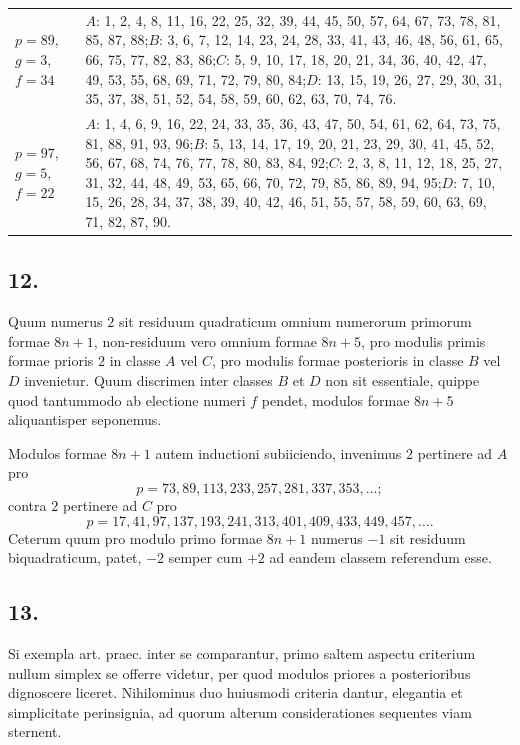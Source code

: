 \documentclass[12pt]{article}
\begin{document}
\begin{longtable}{>{\raggedright\arraybackslash}p{}p{}}
$p=89$, $g=3$, $f=34$ &
$A$: 1, 2, 4, 8, 11, 16, 22, 25, 32, 39, 44, 45, 50, 57, 64, 67, 73, 78, 81, 85, 87, 88;\quad $B$: 3, 6, 7, 12, 14, 23, 24, 28, 33, 41, 43, 46, 48, 56, 61, 65, 66, 75, 77, 82, 83, 86;\quad $C$: 5, 9, 10, 17, 18, 20, 21, 34, 36, 40, 42, 47, 49, 53, 55, 68, 69, 71, 72, 79, 80, 84;\quad $D$: 13, 15, 19, 26, 27, 29, 30, 31, 35, 37, 38, 51, 52, 54, 58, 59, 60, 62, 63, 70, 74, 76.\\[2pt]
$p=97$, $g=5$, $f=22$ &
$A$: 1, 4, 6, 9, 16, 22, 24, 33, 35, 36, 43, 47, 50, 54, 61, 62, 64, 73, 75, 81, 88, 91, 93, 96;\quad $B$: 5, 13, 14, 17, 19, 20, 21, 23, 29, 30, 41, 45, 52, 56, 67, 68, 74, 76, 77, 78, 80, 83, 84, 92;\quad $C$: 2, 3, 8, 11, 12, 18, 25, 27, 31, 32, 44, 48, 49, 53, 65, 66, 70, 72, 79, 85, 86, 89, 94, 95;\quad $D$: 7, 10, 15, 26, 28, 34, 37, 38, 39, 40, 42, 46, 51, 55, 57, 58, 59, 60, 63, 69, 71, 82, 87, 90.\\
\bottomrule
\end{longtable}

\subsection*{12.}

Quum numerus $2$ sit residuum quadraticum omnium numerorum primorum formae $8n+1$, non-residuum vero omnium formae $8n+5$, pro modulis primis formae prioris $2$ in classe $A$ vel $C$, pro modulis formae posterioris in classe $B$ vel $D$ invenietur. Quum discrimen inter classes $B$ et $D$ non sit essentiale, quippe quod tantummodo ab electione numeri $f$ pendet, modulos formae $8n+5$ aliquantisper seponemus.

Modulos formae $8n+1$ autem inductioni subiiciendo, invenimus $2$ pertinere ad $A$ pro
\[
p=73,89,113,233,257,281,337,353,\ldots;
\]
contra $2$ pertinere ad $C$ pro
\[
p=17,41,97,137,193,241,313,401,409,433,449,457,\ldots.
\]
Ceterum quum pro modulo primo formae $8n+1$ numerus $-1$ sit residuum biquadraticum, patet, $-2$ semper cum $+2$ ad eandem classem referendum esse.

\subsection*{13.}

Si exempla art. praec. inter se comparantur, primo saltem aspectu criterium nullum simplex se offerre videtur, per quod modulos priores a posterioribus dignoscere liceret. Nihilominus duo huiusmodi criteria dantur, elegantia et simplicitate perinsignia, ad quorum alterum considerationes sequentes viam sternent.
\end{document}
